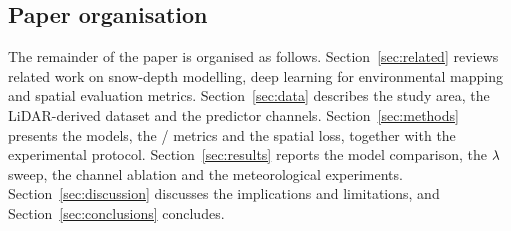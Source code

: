 \subsection{Paper organisation}
\label{subsec:organisation}

The remainder of the paper is organised as follows.
Section~\ref{sec:related} reviews related work on snow-depth modelling, deep
learning for environmental mapping and spatial evaluation metrics.
Section~\ref{sec:data} describes the study area, the LiDAR-derived dataset and
the predictor channels.
Section~\ref{sec:methods} presents the models, the \SPAEF{}/\MSPAEF{} metrics
and the spatial loss, together with the experimental protocol.
Section~\ref{sec:results} reports the model comparison, the $\lambda$ sweep, the
channel ablation and the meteorological experiments.
Section~\ref{sec:discussion} discusses the implications and limitations, and
Section~\ref{sec:conclusions} concludes.
